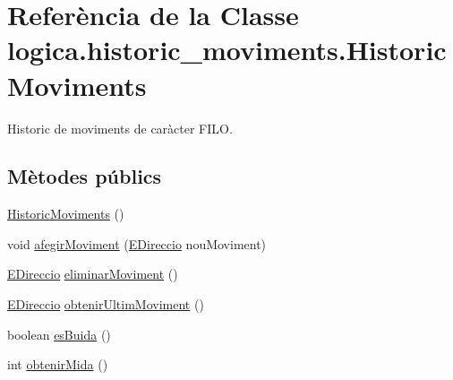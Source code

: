 \hypertarget{classlogica_1_1historic__moviments_1_1_historic_moviments}{\section{Referència de la Classe logica.\+historic\+\_\+moviments.\+Historic\+Moviments}
\label{classlogica_1_1historic__moviments_1_1_historic_moviments}
}


Historic de moviments de caràcter F\+I\+L\+O.  


\subsection*{Mètodes públics}
\begin{DoxyCompactItemize}
\item 
\hyperlink{classlogica_1_1historic__moviments_1_1_historic_moviments_a495dab908c92d96be0111a337aa64616}{Historic\+Moviments} ()
\item 
void \hyperlink{classlogica_1_1historic__moviments_1_1_historic_moviments_add8ce785d3feabe0489005024fa34c31}{afegir\+Moviment} (\hyperlink{enumlogica_1_1enumeracions_1_1_e_direccio}{E\+Direccio} nou\+Moviment)
\item 
\hyperlink{enumlogica_1_1enumeracions_1_1_e_direccio}{E\+Direccio} \hyperlink{classlogica_1_1historic__moviments_1_1_historic_moviments_af8ab1a5f7f30d6bf02567247f551a56d}{eliminar\+Moviment} ()
\item 
\hyperlink{enumlogica_1_1enumeracions_1_1_e_direccio}{E\+Direccio} \hyperlink{classlogica_1_1historic__moviments_1_1_historic_moviments_a38f0ad91020d373f59f3ca715d8348cd}{obtenir\+Ultim\+Moviment} ()
\item 
boolean \hyperlink{classlogica_1_1historic__moviments_1_1_historic_moviments_a6a28bbb1fb8d5d017b98ff6fae9cb684}{es\+Buida} ()
\item 
int \hyperlink{classlogica_1_1historic__moviments_1_1_historic_moviments_ae8749aa4dc16dc362b784796325dbc92}{obtenir\+Mida} ()
\end{DoxyCompactItemize}

